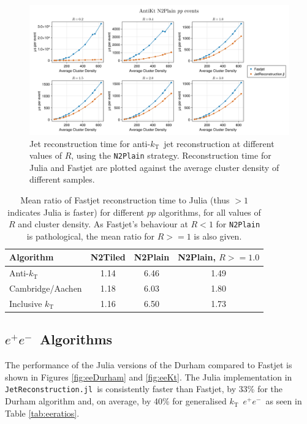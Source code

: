 \documentclass{webofc}
\newcommand{\kt}{${k}_\text{T}$}
\newcommand{\akt}{anti-${k}_\text{T}$}
\newcommand{\Akt}{Anti-${k}_\text{T}$}
\newcommand{\JR}{\texttt{JetReconstruction.jl}}
\newcommand{\ee}{$e^+e^-$}
\begin{document}
\begin{figure}[h]
    \begin{center}
        \includegraphics[width=0.8\linewidth]{Alma9-AMD-Ryzen7-Julia-Fastjet-AntiKt-N2Plain-MultiR.png}
        \caption{Jet reconstruction time for \akt\ jet reconstruction at different values of $R$, using the \texttt{N2Plain} strategy. Reconstruction time for Julia and Fastjet are plotted against the average cluster density of different samples.}
        \label{fig:antiktPlainResults}
    \end{center}
\end{figure}

\begin{table}[h]
    \begin{center}
        \begin{tabular}{l|ccc}
            \textbf{Algorithm} & \textbf{N2Tiled} & \textbf{N2Plain} & \textbf{N2Plain}, $R>=1.0$ \\
            \hline
            \Akt & 1.14 & 6.46 & 1.49 \\
            Cambridge/Aachen & 1.18 & 6.03 & 1.80 \\
            Inclusive \kt & 1.16 & 6.50 & 1.73 \\
        \end{tabular}
        \caption{Mean ratio of Fastjet reconstruction time to Julia (thus $>1$ indicates Julia is faster) for different $pp$ algorithms, for all values of $R$ and cluster density. As Fastjet's behaviour at $R<1$ for \texttt{N2Plain} is pathological, the mean ratio for $R>=1$ is also given.}
        \label{tab:ppratios}
    \end{center}
\end{table}

\subsection{\ee\ Algorithms}

The performance of the Julia versions of the Durham compared to Fastjet is shown
in Figures \ref{fig:eeDurham} and \ref{fig:eeKt}. The Julia implementation in
\JR\ is consistently faster than Fastjet, by 33\% for the Durham algorithm and,
on average, by 40\% for generalised \kt\ \ee\, as seen in Table \ref{tab:eeratios}.
\end{document}

